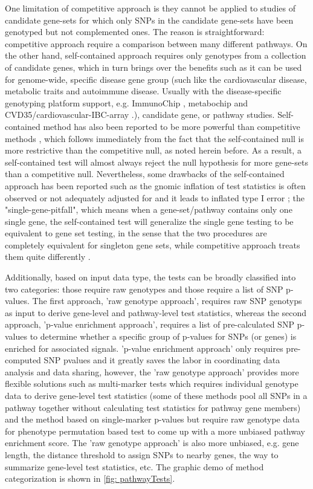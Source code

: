 \documentclass[12pt]{article}
\begin{document}
One limitation of competitive approach is they cannot be applied to studies of candidate gene-sets for
which only SNPs in the candidate gene-sets have been genotyped but not complemented ones. The reason is straightforward: competitive approach require a comparison between many different pathways. On the other hand, self-contained approach requires only genotypes from a collection of candidate genes, which in turn brings over the benefits such as it can be used for genome-wide, specific disease gene group (such like the cardiovascular disease, metabolic traits and autoimmune disease. Usually with the disease-specific genotyping platform support, e.g. ImmunoChip \cite{Cortes2011}, metabochip \cite{Voight2012} and CVD35/cardiovascular-IBC-array \cite{Cheng1999,Keating2008}.), candidate gene, or pathway studies. Self-contained method has also been reported to be more powerful than competitive methods \cite{Goeman2007}, which follows immediately from the fact that the self-contained null is more restrictive than the competitive null, as noted herein before. As a result, a self-contained test will almost always reject the null hypothesis for more gene-sets than a competitive null. Nevertheless, some drawbacks of the self-contained approach has been reported such as the gnomic inflation of test statistics is often observed or not adequately adjusted for and it leads to inflated type I error \cite{wang2007pathway,Goeman2007,Fridley2010}; the "single-gene-pitfall", which means when a gene-set/pathway contains only one single gene, the self-contained test will generalize the single gene testing to be equivalent to gene set testing, in the sense that the two procedures are completely equivalent for singleton gene sets, while competitive approach treats them quite differently \cite{Goeman2007}. 

Additionally, based on input data type, the tests can be broadly classified into two categories: those require raw genotypes and those require a list of SNP p-values. The first approach, 'raw genotype approach', requires raw SNP genotyps as input to derive gene-level and pathway-level test statistics, whereas the second approach, 'p-value enrichment approach', requires a list of pre-calculated SNP p-values to determine whether a specific group of p-values for SNPs (or genes) is enriched for associated signals. 'p-value enrichment approach' only requires pre-computed SNP pvalues and it greatly saves the labor in coordinating data analysis and data sharing, however, the 'raw genotype approach' provides more flexible solutions such as multi-marker tests which requires individual genotype data to derive gene-level test statistics (some of these methods pool all SNPs in a pathway together without calculating test statistics for pathway gene members) and the method based on single-marker p-values but require raw genotype data for phenotype permutation based test to come up with a more unbiased pathway enrichment score. The 'raw genotype approach' is also more unbiased, e.g. gene length, the distance threshold to assign SNPs to nearby genes, the way to summarize gene-level test statistics, etc. The graphic demo of method categorization is shown in \ref{fig: pathwayTests}.
\end{document}

